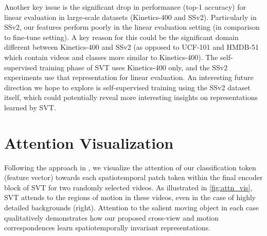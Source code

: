 \documentclass[10pt,twocolumn,letterpaper]{article}
\begin{document}
Another key issue is the significant drop in performance (top-1 accuracy) for linear evaluation in large-scale datasets (Kinetics-400 and SSv2). Particularly in SSv2, our features perform poorly in the linear evaluation setting (in comparison to fine-tune setting). A key reason for this could be the significant domain different between Kinetics-400 and SSv2 (as opposed to UCF-101 and HMDB-51 which contain videos and classes more similar to Kinetics-400). The self-supervised training phase of SVT uses Kinetics-400 only, and the SSv2 experiments use that representation for linear evaluation. An interesting future direction we hope to explore is self-supervised training using the SSv2 dataset itself, which could potentially reveal more interesting insights on representations learned by SVT.   


\section{Attention Visualization}

Following the approach in \cite{caron2021emerging}, we visualize the attention of our classification token (feature vector) towards each spatiotemporal patch token within the final encoder block of SVT for two randomly selected videos. As illustrated in \cref{fig:attn_vis}, SVT attends to the regions of motion in these videos, even in the case of highly detailed backgrounds (right). Attention to the salient moving object in each case qualitatively demonstrates how our proposed cross-view and motion correspondences learn spatiotemporally invariant representations.
 
\end{document}
